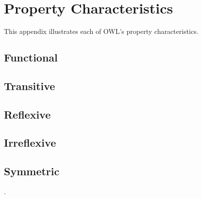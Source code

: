 \chapter{Property Characteristics}
\label{chap:char}

This appendix illustrates each of OWL's property characteristics.

\section{Functional}

\section{Transitive}

\section{Reflexive}

\section{Irreflexive}


\section{Symmetric}
.
